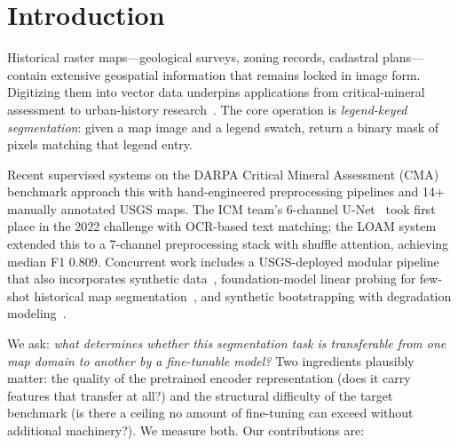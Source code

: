 \documentclass[sigconf,nonacm]{acmart}
\begin{document}

\maketitle


\section{Introduction}
\label{sec:intro}

Historical raster maps---geological surveys, zoning records, cadastral
plans---contain extensive geospatial information that remains locked in
image form. Digitizing them into vector data underpins applications from
critical-mineral assessment to urban-history research~\cite{chiang2014survey}.
The core operation is \emph{legend-keyed segmentation}: given a map image and
a legend swatch, return a binary mask of pixels matching that legend entry.

Recent supervised systems on the DARPA Critical Mineral Assessment (CMA)
benchmark approach this with hand-engineered preprocessing pipelines and 14+
manually annotated USGS maps. The ICM team's 6-channel U-Net~\cite{luo2023icm}
took first place in the 2022 challenge with OCR-based text matching; the
LOAM system~\cite{lin2023loam} extended this to a 7-channel preprocessing
stack with shuffle attention, achieving median F1 $0.809$. Concurrent work
includes a USGS-deployed modular pipeline that also incorporates synthetic
data~\cite{duan2025digmapper}, foundation-model linear probing for few-shot
historical map segmentation~\cite{sterzinger2025fewshot}, and synthetic
bootstrapping with degradation modeling~\cite{arzoumanidis2025synthetic}.

We ask: \emph{what determines whether this segmentation task is transferable
from one map domain to another by a fine-tunable model?} Two ingredients
plausibly matter: the quality of the pretrained encoder representation
(does it carry features that transfer at all?) and the structural difficulty
of the target benchmark (is there a ceiling no amount of fine-tuning can
exceed without additional machinery?). We measure both. Our contributions are:
\end{document}
